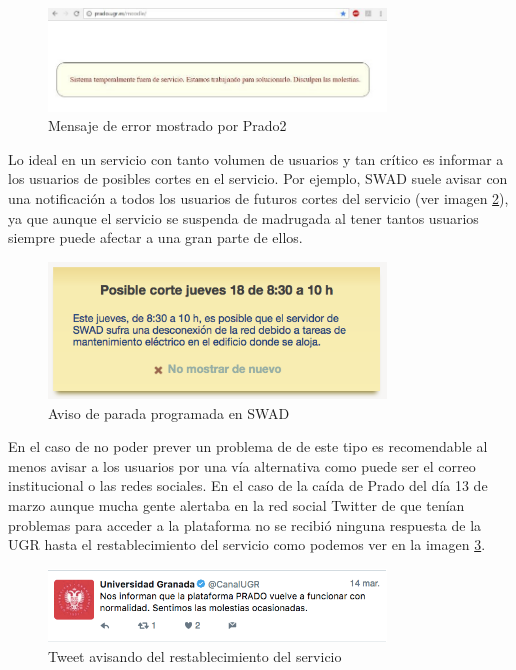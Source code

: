 \begin{figure}[h!]
\centering
\includegraphics[width=0.8\textwidth]{../images/pradocaido}
\caption{Mensaje de error mostrado por Prado2}
\label{fig:pradocaido}
\end{figure}

\bigskip
Lo ideal en un servicio con tanto volumen de usuarios y tan crítico es informar a los usuarios de posibles cortes en el servicio. Por ejemplo, SWAD suele avisar con una notificación a todos los usuarios de futuros cortes del servicio (ver imagen \ref{fig:paroprogramadoswad}), ya que aunque el servicio se suspenda de madrugada al tener tantos usuarios siempre puede afectar a una gran parte de ellos. 

\begin{figure}[H]
\centering
\includegraphics[width=0.8\textwidth]{../images/paroprogramadoswad}
\caption{Aviso de parada programada en SWAD}
\label{fig:paroprogramadoswad}
\end{figure}

\bigskip
En el caso de no poder prever un problema de de este tipo es recomendable al menos avisar a los usuarios por una vía alternativa como puede ser el correo institucional o las redes sociales. En el caso de la caída de Prado del día 13  de marzo aunque mucha gente alertaba en la red social Twitter de que tenían problemas para acceder a la plataforma no se recibió ninguna respuesta de la UGR hasta el restablecimiento del servicio como podemos ver en la imagen \ref{fig:tweet}. 



\begin{figure}[H]
\centering
\includegraphics[width=0.8\textwidth]{../images/tweet}
\caption{Tweet avisando del restablecimiento del servicio}
\label{fig:tweet}
\end{figure}

